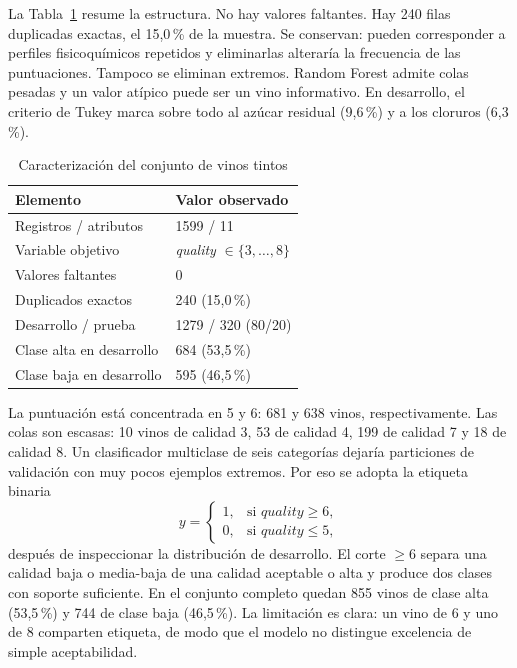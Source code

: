 \documentclass[conference]{IEEEtran}
\begin{document}
La Tabla~\ref{tab:dataset} resume la estructura. No hay valores faltantes. Hay 240 filas duplicadas exactas, el 15,0\,\% de la muestra. Se conservan: pueden corresponder a perfiles fisicoquímicos repetidos y eliminarlas alteraría la frecuencia de las puntuaciones. Tampoco se eliminan extremos. Random Forest admite colas pesadas y un valor atípico puede ser un vino informativo. En desarrollo, el criterio de Tukey marca sobre todo al azúcar residual (9,6\,\%) y a los cloruros (6,3\,\%).

\begin{table}[!t]
\caption{Caracterización del conjunto de vinos tintos}
\label{tab:dataset}
\centering
\footnotesize
\begin{tabular}{@{}ll@{}}
\toprule
Elemento & Valor observado \\
\midrule
Registros / atributos & 1599 / 11 \\
Variable objetivo & \emph{quality} $\in \{3,\ldots,8\}$ \\
Valores faltantes & 0 \\
Duplicados exactos & 240 (15,0\,\%) \\
Desarrollo / prueba & 1279 / 320 (80/20) \\
Clase alta en desarrollo & 684 (53,5\,\%) \\
Clase baja en desarrollo & 595 (46,5\,\%) \\
\bottomrule
\end{tabular}
\end{table}

La puntuación está concentrada en 5 y 6: 681 y 638 vinos, respectivamente. Las colas son escasas: 10 vinos de calidad 3, 53 de calidad 4, 199 de calidad 7 y 18 de calidad 8. Un clasificador multiclase de seis categorías dejaría particiones de validación con muy pocos ejemplos extremos. Por eso se adopta la etiqueta binaria
\begin{equation}
y =
\begin{cases}
1, & \text{si } \mathit{quality} \geq 6,\\
0, & \text{si } \mathit{quality} \leq 5,
\end{cases}
\label{eq:umbral}
\end{equation}
después de inspeccionar la distribución de desarrollo. El corte $\geq 6$ separa una calidad baja o media-baja de una calidad aceptable o alta y produce dos clases con soporte suficiente. En el conjunto completo quedan 855 vinos de clase alta (53,5\,\%) y 744 de clase baja (46,5\,\%). La limitación es clara: un vino de 6 y uno de 8 comparten etiqueta, de modo que el modelo no distingue excelencia de simple aceptabilidad.
\end{document}
